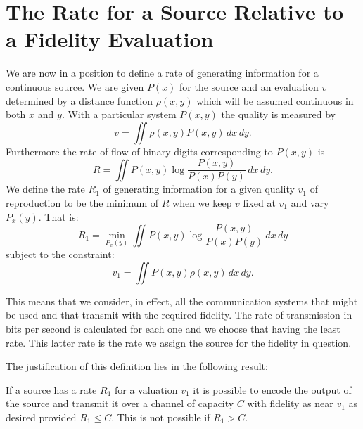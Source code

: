 \section{The Rate for a Source Relative to a Fidelity Evaluation}

We are now in a position to define a rate of generating information for a
continuous source.  We are given $P(x)$ for the source and an evaluation
$v$ determined by a distance function $\rho(x,y)$ which will be assumed
continuous in both $x$ and $y$.  With a particular system $P(x,y)$ the
quality is measured by
$$
v=\iint\rho(x,y)P(x,y)\,dx\,dy.
$$
Furthermore the rate of flow of binary digits corresponding to $P(x,y)$ is
$$
R=\iint P(x,y)\log\frac{P(x,y)}{P(x)P(y)}\,dx\,dy.
$$
We define the rate $R_1$ of generating information for a given quality
$v_1$ of reproduction to be the minimum of $R$ when we keep $v$ fixed at
$v_1$ and vary $P_x(y)$.  That is:
$$
R_1=\min_{P_x(y)}\iint P(x,y)\log\frac{P(x,y)}{P(x)P(y)}\,dx\,dy
$$
subject to the constraint:
$$
v_1=\iint P(x,y)\rho(x,y)\,dx\,dy.
$$

This means that we consider, in effect, all the communication systems that
might be used and that transmit with the required fidelity.  The rate of
transmission in bits per second is calculated for each one and we choose
that having the least rate.  This latter rate is the rate we assign the
source for the fidelity in question.

The justification of this definition lies in the following result:
\begin{theorem}
\label{thm:21}
If a source has a rate $R_1$ for a valuation $v_1$ it is possible to encode
the output of the source and transmit it over a channel of capacity $C$
with fidelity as near $v_1$ as desired provided $R_1\leq C$.  This is not
possible if $R_1>C$.
\end{theorem}

